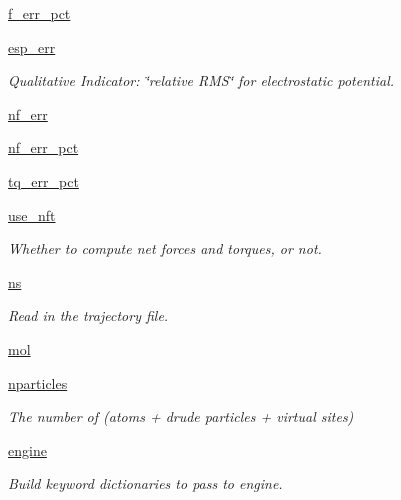 \begin{DoxyCompactItemize}
\hyperlink{classforcebalance_1_1abinitio_1_1AbInitio_ab6ee932ad4689f538c746310939dd0bc}{f\-\_\-err\-\_\-pct}
\item 
\hyperlink{classforcebalance_1_1abinitio_1_1AbInitio_abdc625c3149cee375b56b4e0d73034fe}{esp\-\_\-err}
\begin{DoxyCompactList}\small\item\em Qualitative Indicator\-: \char`\"{}relative R\-M\-S\char`\"{} for electrostatic potential. \end{DoxyCompactList}\item 
\hyperlink{classforcebalance_1_1abinitio_1_1AbInitio_a89de620e9aa500481c9e1ded99e14f72}{nf\-\_\-err}
\item 
\hyperlink{classforcebalance_1_1abinitio_1_1AbInitio_a184edac2cb27a999c363595ea59d8163}{nf\-\_\-err\-\_\-pct}
\item 
\hyperlink{classforcebalance_1_1abinitio_1_1AbInitio_a184f2a783b2710f6f75842afdeccf14e}{tq\-\_\-err\-\_\-pct}
\item 
\hyperlink{classforcebalance_1_1abinitio_1_1AbInitio_afd8d179560a295ffa6c6309843c59279}{use\-\_\-nft}
\begin{DoxyCompactList}\small\item\em Whether to compute net forces and torques, or not. \end{DoxyCompactList}\item 
\hyperlink{classforcebalance_1_1abinitio_1_1AbInitio_a1e8248e2efe952362b1b21462a70b540}{ns}
\begin{DoxyCompactList}\small\item\em Read in the trajectory file. \end{DoxyCompactList}\item 
\hyperlink{classforcebalance_1_1abinitio_1_1AbInitio_ace30686ab072c0520154d15855c5e885}{mol}
\item 
\hyperlink{classforcebalance_1_1abinitio_1_1AbInitio_aef3798e4666b91ecc4c526b679eb4908}{nparticles}
\begin{DoxyCompactList}\small\item\em The number of (atoms + drude particles + virtual sites) \end{DoxyCompactList}\item 
\hyperlink{classforcebalance_1_1abinitio_1_1AbInitio_a34058fdf49b7b3b8f1fea78dd30f3209}{engine}
\begin{DoxyCompactList}\small\item\em Build keyword dictionaries to pass to engine. \end{DoxyCompactList}\item 

\end{DoxyCompactItemize}
